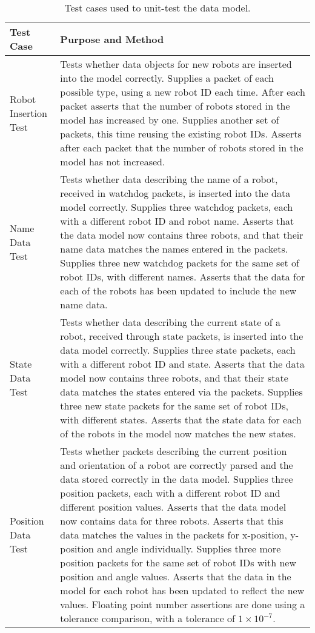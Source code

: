 \begin{longtable}{ l p{10cm} }
\caption[Data Model Test Cases]{Test cases used to unit-test the data model.}\\
 Test Case & Purpose and Method\\
 \hline
 Robot Insertion Test & Tests whether data objects for new robots are inserted into the model correctly. Supplies a packet of each possible type, using a new robot ID each time. After each packet asserts that the number of robots stored in the model has increased by one. Supplies another set of packets, this time reusing the existing robot IDs. Asserts after each packet that the number of robots stored in the model has not increased.\\
 Name Data Test & Tests whether data describing the name of a robot, received in watchdog packets, is inserted into the data model correctly. Supplies three watchdog packets, each with a different robot ID and robot name. Asserts that the data model now contains three robots, and that their name data matches the names entered in the packets. Supplies three new watchdog packets for the same set of robot IDs, with different names. Asserts that the data for each of the robots has been updated to include the new name data.\\
 State Data Test & Tests whether data describing the current state of a robot, received through state packets, is inserted into the data model correctly. Supplies three state packets, each with a different robot ID and state. Asserts that the data model now contains three robots, and that their state data matches the states entered via the packets. Supplies three new state packets for the same set of robot IDs, with different states. Asserts that the state data for each of the robots in the model now matches the new states.\\
 Position Data Test & Tests whether packets describing the current position and orientation of a robot are correctly parsed and the data stored correctly in the data model. Supplies three position packets, each with a different robot ID and different position values. Asserts that the data model now contains data for three robots. Asserts that this data matches the values in the packets for x-position, y-position and angle individually. Supplies three more position packets for the same set of robot IDs with new position and angle values. Asserts that the data in the model for each robot has been updated to reflect the new values. Floating point number assertions are done using a tolerance comparison, with a tolerance of $ 1 \times 10^{-7} $.\\

\end{longtable}
